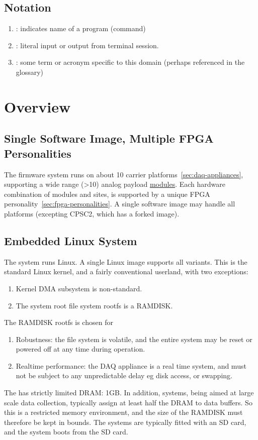 \documentclass[]{article}
\begin{document}
\subsection{Notation}
\begin{enumerate}
    \item {}  : indicates name of a program (command)
    \item {} : literal input or output from terminal session.
    \item {} : some term or acronym specific to this domain (perhaps referenced in the glossary)
\end{enumerate} 

\pagebreak
\section{Overview}

\subsection{Single Software Image, Multiple FPGA Personalities}
The  firmware system runs on about 10 carrier platforms~\ref{sec:daq-appliances}, supporting a wide range (>10) analog payload \href{https://www.d-tacq.com/modproducts_modules.shtml}{modules}.  Each hardware combination of modules and sites, is supported by a unique FPGA personality~\ref{sec:fpga-personalities}. A single software image may handle all platforms (excepting CPSC2, which has a forked image).

\subsection{Embedded Linux System}
The  system runs Linux. A single Linux image supports all variants. This is the standard Linux kernel, and a fairly conventional userland, with two exceptions:
\begin{enumerate}
    \item Kernel DMA subsystem is non-standard.
    \item The system root file system rootfs is a RAMDISK. 
\end{enumerate} 

The RAMDISK rootfs is chosen for 
\begin{enumerate}
    \item Robustness: the file system is volatile, and the entire system may be reset or powered off at any time during operation. 
    \item Realtime performance: the DAQ appliance is a real time system, and must not be subject to any unpredictable delay eg disk access, or swapping.
\end{enumerate} 
The  has strictly limited DRAM: 1GB. In addition,  systems, being aimed at large scale data collection, typically assign at least half the DRAM to data buffers. So this is a restricted memory environment, and the size of the RAMDISK must therefore be kept in bounds.
The systems are typically fitted with an SD card, and the system boots from the SD card.
\end{document}
